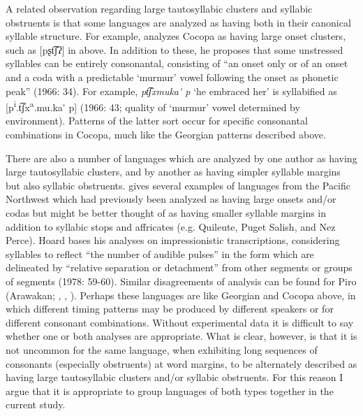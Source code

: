   A related observation regarding large tautosyllabic clusters and syllabic obstruents is that some languages are analyzed as having both in their canonical syllable structure. For example, \citet{Crawford1966} analyzes Cocopa as having large onset clusters, such as [pʂt͡ʃʔ] in  above. In addition to these, he proposes that some unstressed syllables can be entirely consonantal, consisting of “an onset only or of an onset and a coda with a predictable ‘murmur’ vowel following the onset as phonetic peak” (1966: 34). For example, \textit{pt͡ʃxmuka\'{} p} ‘he embraced her’ is syllabified as [p\textsuperscript{i}.t͡ʃx\textsuperscript{a}.mu.ka\'{} p] (1966: 43; quality of ‘murmur’ vowel determined by environment). Patterns of the latter sort occur for specific consonantal combinations in Cocopa, much like the Georgian patterns described above. 

  There are also a number of languages which are analyzed by one author as having large tautosyllabic clusters, and by another as having simpler syllable margins but also syllabic obstruents. \citet{Hoard1978} gives several examples of languages from the Pacific Northwest which had previously been analyzed as having large onsets and/or codas but might be better thought of as having smaller syllable margins in addition to syllabic stops and affricates (e.g. Quileute, Puget Salish, and Nez Perce). Hoard bases his analyses on impressionistic transcriptions, considering syllables to reflect “the number of audible pulses” in the form which are delineated by “relative separation or detachment” from other segments or groups of segments (1978: 59-60). Similar disagreements of analysis can be found for Piro (Arawakan; \citealt{Matteson1965}, \citealt{Lin1997}, \citealt{Hanson2010}). Perhaps these languages are like Georgian and Cocopa above, in which different timing patterns may be produced by different speakers or for different consonant combinations. Without experimental data it is difficult to say whether one or both analyses are appropriate. What is clear, however, is that it is not uncommon for the same language, when exhibiting long sequences of consonants (especially obstruents) at word margins, to be alternately described as having large tautosyllabic clusters and/or syllabic obstruents. For this reason I argue that it is appropriate to group languages of both types together in the current study.

